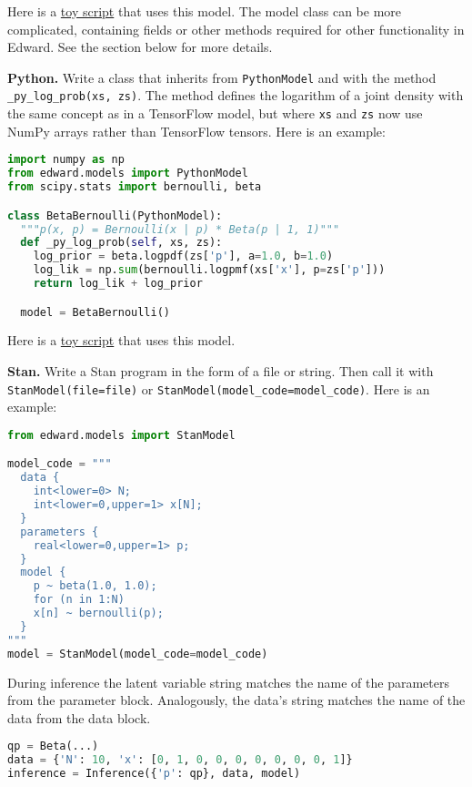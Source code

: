 Here is a
\href{https://github.com/blei-lab/edward/blob/master/examples/tf_beta_bernoulli.py}
{toy script}
that uses this model. The model class can be more complicated,
containing fields or other methods required for other functionality in
Edward. See the section below for more details.

\textbf{Python.}
Write a class that inherits from \texttt{PythonModel} and with the method
\texttt{_py_log_prob(xs, zs)}. The method defines the logarithm of a joint
density with the same concept as in a TensorFlow model, but where
\texttt{xs} and \texttt{zs} now use NumPy arrays rather than TensorFlow tensors.
Here is an example:

\begin{lstlisting}[language=Python]
import numpy as np
from edward.models import PythonModel
from scipy.stats import bernoulli, beta

class BetaBernoulli(PythonModel):
  """p(x, p) = Bernoulli(x | p) * Beta(p | 1, 1)"""
  def _py_log_prob(self, xs, zs):
    log_prior = beta.logpdf(zs['p'], a=1.0, b=1.0)
    log_lik = np.sum(bernoulli.logpmf(xs['x'], p=zs['p']))
    return log_lik + log_prior

  model = BetaBernoulli()
\end{lstlisting}

Here is a
\href{https://github.com/blei-lab/edward/blob/master/examples/np_beta_bernoulli.py}
{toy script}
that uses this model.

\textbf{Stan.}
Write a Stan program in the form of a file or string. Then
call it with \texttt{StanModel(file=file)} or
\texttt{StanModel(model_code=model_code)}. Here is an example:

\begin{lstlisting}[language=Python]
from edward.models import StanModel

model_code = """
  data {
    int<lower=0> N;
    int<lower=0,upper=1> x[N];
  }
  parameters {
    real<lower=0,upper=1> p;
  }
  model {
    p ~ beta(1.0, 1.0);
    for (n in 1:N)
    x[n] ~ bernoulli(p);
  }
"""
model = StanModel(model_code=model_code)
\end{lstlisting}

During inference the latent variable string matches the name of the
parameters from the parameter block. Analogously, the data's string
matches the name of the data from the data block.

\begin{lstlisting}[language=Python]
qp = Beta(...)
data = {'N': 10, 'x': [0, 1, 0, 0, 0, 0, 0, 0, 0, 1]}
inference = Inference({'p': qp}, data, model)
\end{lstlisting}

